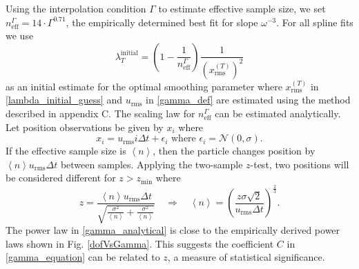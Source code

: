 \documentclass{ametsoc}
\begin{document}
Using the interpolation condition $\Gamma$ to estimate effective sample size, we set $n_{\textrm{eff}}^\Gamma = 14 \cdot \Gamma^{0.71}$, the empirically determined best fit for slope $\omega^{-3}$.  For all spline fits we use
\begin{equation}
\label{lambda_initial_guess}
\lambda^{\textrm{initial}}_T = \left( 1 -\frac{1}{n_{\textrm{eff}}^\Gamma}\right) \frac{1}{ \left(x^{(T)}_{\textrm{rms}}\right)^2  }
\end{equation}
as an initial estimate for the optimal smoothing parameter where $x^{(T)}_{\textrm{rms}}$ in \eqref{lambda_initial_guess} and $u_\textrm{rms}$ in \eqref{gamma_def} are estimated using the method described in appendix C. The scaling law for $n_{\textrm{eff}}^\Gamma$ can be estimated analytically.
Let position observations be given by $x_i$ where
\begin{equation}
x_i = u_\textrm{rms} i \Delta t + \epsilon_i \textrm{ where } \epsilon_i = \mathcal{N}(0,\sigma).
\end{equation}
If the effective sample size is $\left\langle n \right\rangle$, then the particle changes position by $\left\langle n \right\rangle u_\textrm{rms} \Delta t$ between samples. Applying the two-sample $z$-test, two positions will be considered different for $z>z_\textrm{min}$ where
\begin{equation}
z= \frac{\left\langle n \right\rangle u_\textrm{rms} \Delta t}{\sqrt{\frac{\sigma^2}{\left\langle n \right\rangle} + \frac{\sigma^2}{\left\langle n \right\rangle} }} \quad
\Rightarrow \quad
\label{gamma_analytical}
\left\langle n \right\rangle = \left( \frac{z \sigma \sqrt{2}}{u_\textrm{rms} \Delta t} \right)^{\frac{2}{3}}.
\end{equation}
The power law in \eqref{gamma_analytical} is close to the empirically derived power laws shown in Fig. \ref{dofVsGamma}. This suggests the coefficient $C$ in \eqref{gamma_equation} can be related to $z$, a measure of statistical significance.
\end{document}
